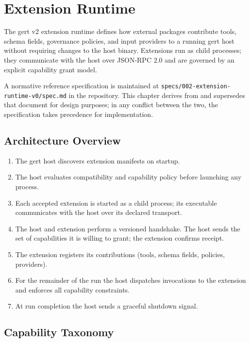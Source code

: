 \chapter{Extension Runtime}

The gert v2 extension runtime defines how external packages contribute tools,
schema fields, governance policies, and input providers to a running gert host
without requiring changes to the host binary.  Extensions run as child
processes; they communicate with the host over JSON-RPC 2.0 and are governed
by an explicit capability grant model.

A normative reference specification is maintained at
\texttt{specs/002-extension-runtime-v0/spec.md} in the repository.  This
chapter derives from and supersedes that document for design purposes; in any
conflict between the two, the specification takes precedence for
implementation.

\section{Architecture Overview}

\begin{enumerate}
  \item The gert host discovers extension manifests on startup.
  \item The host evaluates compatibility and capability policy before launching
        any process.
  \item Each accepted extension is started as a child process; its executable
        communicates with the host over its declared transport.
  \item The host and extension perform a versioned handshake.  The host sends
        the set of capabilities it is willing to grant; the extension confirms
        receipt.
  \item The extension registers its contributions (tools, schema fields,
        policies, providers).
  \item For the remainder of the run the host dispatches invocations to the
        extension and enforces all capability constraints.
  \item At run completion the host sends a graceful shutdown signal.
\end{enumerate}

\section{Capability Taxonomy}
\label{sec:ext-capabilities}

